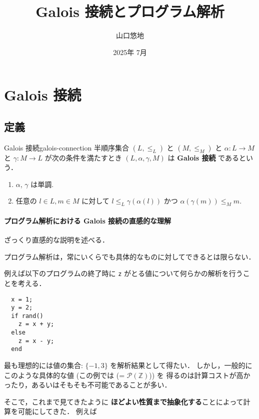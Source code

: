 \documentclass[uplatex]{jsarticle}
\title{Galois 接続とプログラム解析}
\author{山口悠地}
\date{2025年 7月}
\begin{document}
\maketitle
\tableofcontents
\newpage
{}

\section{Galois 接続}

\subsection{定義}

\begin{boxdefinition}{Galois 接続}{galois-connection}
  半順序集合 $(L, \leq_L)$ と $(M, \leq_M)$
  と $\alpha: L \to M$ と $\gamma: M \to L$ が次の条件を満たすとき $(L, \alpha, \gamma, M)$ は \textbf{Galois 接続} であるという．
  \begin{enumerate}
    \item $\alpha$, $\gamma$ は単調.
    \item 任意の $l \in L, m \in M$ に対して $l \leq_L \gamma(\alpha(l))$ かつ $\alpha(\gamma(m)) \leq_M m$.
  \end{enumerate}
\end{boxdefinition}

\paragraph*{プログラム解析における Galois 接続の直感的な理解}

ざっくり直感的な説明を述べる．

プログラム解析は，常にいくらでも具体的なものに対してできるとは限らない．

例えば以下のプログラムの終了時に \lstinline|z| がとる値について何らかの解析を行うことを考える．

\begin{lstlisting}
  x = 1;
  y = 2;
  if rand()
    z = x + y;
  else
    z = x - y;
  end
\end{lstlisting}

最も理想的には値の集合: $\{-1, 3\}$ を解析結果として得たい．
しかし，一般的にこのような具体的な値 (この例では (= $\mathcal{P}(\mathbb{Z})$)) を
得るのは計算コストが高かったり，あるいはそもそも不可能であることが多い．

そこで，これまで見てきたように \textbf{ほどよい性質まで抽象化する}ことによって計算を可能にしてきた．
例えば
\end{document}
